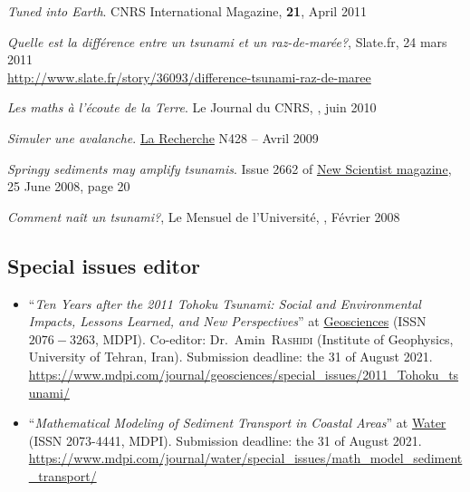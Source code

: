 \documentclass[final, a4paper, oneside, 12pt]{article}
\numberwithin{equation}{section}
\begin{document}
\begin{etaremune}
  \item \textit{Tuned into Earth}. CNRS International Magazine, \textbf{21}, April 2011
  
  \item \textit{Quelle est la diff\'erence entre un tsunami et un raz-de-mar\'ee?}, Slate.fr, 24 mars 2011 \\ \url{http://www.slate.fr/story/36093/difference-tsunami-raz-de-maree}
  
  \item \textit{Les maths \`a l'\'ecoute de la Terre}. Le Journal du CNRS, , juin 2010
  
  \item \textit{Simuler une avalanche}. \href{http://www.larecherche.fr/}{La Recherche} N428 -- Avril 2009
  
  \item \textit{Springy sediments may amplify tsunamis}. Issue 2662 of \href{http://www.newscientist.com/}{New Scientist magazine}, 25 June 2008, page 20
  
  \item \textit{Comment na\^it un tsunami?}, Le Mensuel de l'Universit\'e, , F\'evrier 2008
  
\end{etaremune}

\subsection{Special issues editor}

\begin{itemize}

  \item ``\textit{Ten Years after the 2011 Tohoku Tsunami: Social and Environmental Impacts, Lessons Learned, and New Perspectives}'' at \href{https://www.mdpi.com/journal/geosciences}{Geosciences} (ISSN $2076-3263$, MDPI). Co-editor: Dr.~Amin~\textsc{Rashidi} (Institute of Geophysics, University of Tehran, Iran). Submission deadline: the 31 of August 2021. \\
  {\small\url{https://www.mdpi.com/journal/geosciences/special_issues/2011_Tohoku_tsunami/}}
  
  \item ``\textit{Mathematical Modeling of Sediment Transport in Coastal Areas}'' at \href{https://www.mdpi.com/journal/water}{Water} (ISSN 2073-4441, MDPI). Submission deadline: the 31 of August 2021. \\
  {\small\url{https://www.mdpi.com/journal/water/special_issues/math_model_sediment_transport/}}

\end{itemize}
\end{document}
